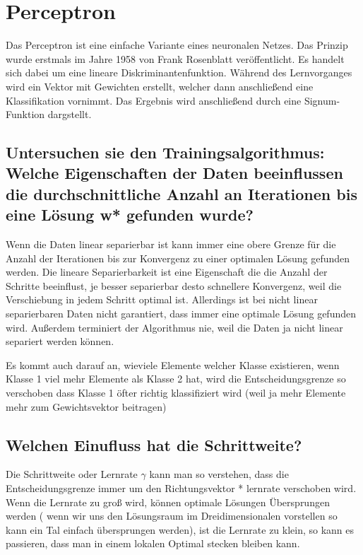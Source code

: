 \section{Perceptron}

Das Perceptron ist eine einfache Variante eines neuronalen Netzes. Das Prinzip wurde erstmals im Jahre 1958 von Frank Rosenblatt veröffentlicht\cite{rosenblatt58}. Es handelt sich dabei um eine lineare Diskriminantenfunktion. Während des Lernvorganges wird ein Vektor mit Gewichten erstellt, welcher dann anschließend eine Klassifikation vornimmt. Das Ergebnis wird anschließend durch eine Signum-Funktion dargstellt.

\subsection{Untersuchen sie den Trainingsalgorithmus: Welche Eigenschaften der Daten beeinflussen die durchschnittliche Anzahl an Iterationen bis eine Lösung w* gefunden wurde?}
Wenn die Daten linear separierbar ist kann immer eine obere Grenze für die Anzahl der Iterationen bis zur Konvergenz zu einer optimalen Lösung gefunden werden.
Die lineare Separierbarkeit ist eine Eigenschaft die die Anzahl der Schritte beeinflust, je besser separierbar desto schnellere Konvergenz, weil die Verschiebung in jedem Schritt optimal ist. Allerdings ist bei nicht linear separierbaren Daten nicht garantiert, dass immer eine optimale Lösung gefunden wird. Außerdem terminiert der Algorithmus nie, weil die Daten ja nicht linear separiert werden können. \par{Es kommt auch darauf an, wieviele Elemente welcher Klasse existieren, wenn Klasse 1 viel mehr Elemente als Klasse 2 hat, wird die Entscheidungsgrenze so verschoben dass Klasse 1 öfter richtig klassifiziert wird (weil ja mehr Elemente mehr zum Gewichtsvektor beitragen)}

\subsection{Welchen Einufluss hat die Schrittweite?}
Die Schrittweite oder Lernrate $\gamma$ kann man so verstehen, dass die Entscheidungsgrenze immer um den Richtungsvektor * lernrate verschoben wird. Wenn die Lernrate zu groß wird, können optimale Lösungen Übersprungen werden ( wenn wir uns den Lösungsraum im Dreidimensionalen vorstellen so kann ein Tal einfach übersprungen werden), ist die Lernrate zu klein, so kann es passieren, dass man in einem lokalen Optimal stecken bleiben kann.

